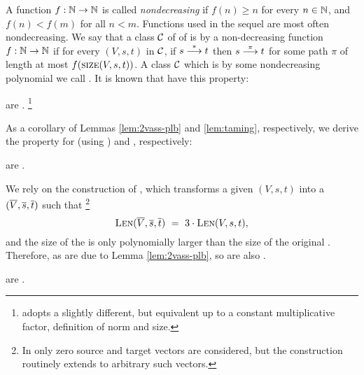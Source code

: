 A function $f:\mathbb{N}\to\mathbb{N}$ is called \emph{nondecreasing} if $f(n) \geq n$ for every $n \in \mathbb{N}$,
and $f(n)< f(m)$ for all $n<m$.
Functions used in the sequel are most often nondecreasing.
%
We say that a class $\mathcal{C}$ of \vass of \zvass is \emph{\lb} by a 
non-decreasing function $f:\mathbb{N}\to\mathbb{N}$ if 
for every $(V, s, t)$ in $\mathcal{C}$, if $s \stackrel{*}{\longrightarrow} t$ then 
$s \stackrel{\pi}{\longrightarrow} t$ for some path $\pi$ of length at most $f(\textsc{size}(V, s, t))$.
A class $\mathcal{C}$ which is \lb  by some nondecreasing
polynomial we call \emph{\plb}.
It is known that \dvass  have this property:
%
\begin{lemma}\label{lem:2vass-plb}
\dvass are \plb.%
\footnote{\cite{DBLP:journals/jacm/BlondinEFGHLMT21} adopts a slightly different, but equivalent
up to a constant multiplicative factor, definition of norm and 
size.
}
\end{lemma}
%
As a corollary of Lemmas \ref{lem:2vass-plb} and \ref{lem:taming}, respectively,
we derive the property for \geomvass 
(using \cite[Lemma 5.1]{Zhang-geom}) and \tzvass, respectively:
%
\begin{lemma}%
\label{lem:geom-plb}
\Geomvass are \plb.
\end{lemma}
%
\begin{appendixproof}
We rely on the construction of \cite[Lemma 5.1]{Zhang-geom}, which transforms a given 
\geomvass $(V, s, t)$ into a \dvass $(\overline{V}, \overline{s}, \overline{t})$ such that%
\footnote{
In \cite{Zhang-geom} only zero source and target vectors are considered, but the construction
routinely extends to arbitrary such vectors. 
}
\[
\textsc{Len}(\overline{V}, \overline{s}, \overline{t}) \ = \ 3 \cdot \textsc{Len}(V, s, t),
\]
and the size of the \dvass is only polynomially larger than the size of the original \geomvass. 
Therefore, as \dvass are \plb due to Lemma \ref{lem:2vass-plb}, so are also \geomvass.
\end{appendixproof}
%
\begin{lemma} \label{lem:zvass-plb}
\tzvass are \plb.
\end{lemma}
%
